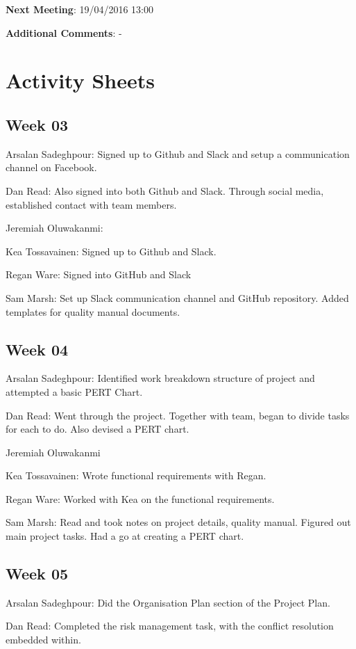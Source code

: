 \documentclass[11pt]{article}
\begin{document}
\textbf{Next Meeting}: 19/04/2016 13:00

\textbf{Additional Comments}: -

\section{Activity Sheets}

\subsection{Week 03}

Arsalan Sadeghpour: Signed up to Github and Slack and setup a communication channel on Facebook.

Dan Read: Also signed into both Github and Slack. Through social media, established contact with team members.

Jeremiah Oluwakanmi:

Kea Tossavainen: Signed up to Github and Slack.

Regan Ware: Signed into GitHub and Slack

Sam Marsh: Set up Slack communication channel and GitHub repository. Added templates for quality manual documents.

\subsection{Week 04}

Arsalan Sadeghpour: Identified work breakdown structure of project and attempted a basic PERT Chart.

Dan Read: Went through the project. Together with team, began to divide tasks for each to do. Also devised a PERT chart.

Jeremiah Oluwakanmi

Kea Tossavainen: Wrote functional requirements with Regan.

Regan Ware: Worked with Kea on the functional requirements.

Sam Marsh: Read and took notes on project details, quality manual. Figured out main project tasks. Had a go at creating a PERT chart.

\subsection{Week 05}

Arsalan Sadeghpour: Did the Organisation Plan section of the Project Plan.

Dan Read: Completed the risk management task, with the conflict resolution embedded within.
\end{document}
